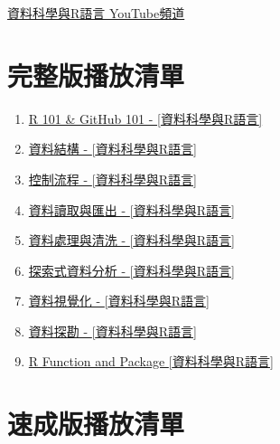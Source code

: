 \documentclass[
]{book}
\providecommand{\tightlist}{%
  \setlength{\itemsep}{0pt}\setlength{\parskip}{0pt}}
\begin{document}
\href{https://www.youtube.com/channel/UC2ZZMRLibtq2fD-la4YV_nA/}{資料科學與R語言 YouTube頻道}

\hypertarget{ux5b8cux6574ux7248ux64adux653eux6e05ux55ae}{%
\section{完整版播放清單}\label{ux5b8cux6574ux7248ux64adux653eux6e05ux55ae}}

\begin{enumerate}
\def\labelenumi{\arabic{enumi}.}
\tightlist
\item
  \href{https://www.youtube.com/playlist?list=PLsKtsWy-7jOxTQiku-l0CkYZdL3uidOUC}{R 101 \& GitHub 101 - {[}資料科學與R語言{]}}
\item
  \href{https://www.youtube.com/playlist?list=PLsKtsWy-7jOwUra70JV-zBaSJc8p9Nlnu}{資料結構 - {[}資料科學與R語言{]}}
\item
  \href{https://www.youtube.com/playlist?list=PLsKtsWy-7jOwII8wk-t6_m4aee9wMg3-6}{控制流程 - {[}資料科學與R語言{]}}
\item
  \href{https://www.youtube.com/playlist?list=PLsKtsWy-7jOzlr_NL7_D--OvmR5ppvaZv}{資料讀取與匯出 - {[}資料科學與R語言{]}}
\item
  \href{https://www.youtube.com/playlist?list=PLsKtsWy-7jOxE3b_zXjA1EX8Job0i6F5S}{資料處理與清洗 - {[}資料科學與R語言{]}}
\item
  \href{https://www.youtube.com/playlist?list=PLsKtsWy-7jOzT7OvpzAXAHwPVnGtZhQD0}{探索式資料分析 - {[}資料科學與R語言{]}}
\item
  \href{https://www.youtube.com/playlist?list=PLsKtsWy-7jOxiRwgXZcxwUP7BKM-WVUV4}{資料視覺化 - {[}資料科學與R語言{]}}
\item
  \href{https://www.youtube.com/playlist?list=PLsKtsWy-7jOyxEedw_cMea3TBHguWRhmi}{資料探勘 - {[}資料科學與R語言{]}}
\item
  \href{https://www.youtube.com/playlist?list=PLsKtsWy-7jOwyavHjFwah57y2ThJ7Lxzr}{R Function and Package {[}資料科學與R語言{]}}
\end{enumerate}

\hypertarget{ux901fux6210ux7248ux64adux653eux6e05ux55ae}{%
\section{速成版播放清單}\label{ux901fux6210ux7248ux64adux653eux6e05ux55ae}}
\end{document}
